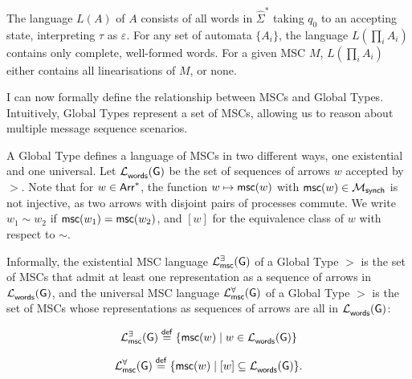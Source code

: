 \begin{definition}
The language $L(A)$ of $A$ consists of all words in $\hat{\Sigma}^*$ 
taking $q_0$ to an accepting state, interpreting $\tau$ as 
$\varepsilon$. For any set of automata $\{A_i\}$, the language 
$L(\prod_i A_i)$ contains only complete, well-formed words. For a 
given MSC $M$, $L(\prod_i A_i)$ either contains all linearisations 
of $M$, or none.
\end{definition}




I can now formally define the relationship between MSCs and Global Types. 
Intuitively, Global Types represent a set of MSCs, allowing us to reason 
about multiple message sequence scenarios. 

A Global Type defines a language of MSCs in two different ways, one
existential and one universal. Let $\mathcal{L}_{\mathsf{words}}^{}(\mathsf{G})$ be the set of
sequences of arrows $w$ accepted by $\gt$. Note that for $w \in \mathsf{Arr}^*$,
the function $w \mapsto \mathsf{msc}(w)$ with
$\mathsf{msc}(w) \in \mathcal{M}_{\mathsf{synch}}$ is not injective, as two
arrows with disjoint pairs of processes commute. We write $w_1 \sim w_2$ if
$\mathsf{msc}(w_1) = \mathsf{msc}(w_2)$, and $[w]$ for the equivalence class
of $w$ with respect to $\sim$.

Informally, the existential MSC language $\mathcal{L}_{\mathsf{msc}}^{\exists}(\mathsf{G}){}$ of a 
Global Type $\gt$ is the set of MSCs that admit at least one representation as a
sequence of arrows in $\mathcal{L}_{\mathsf{words}}^{}(\mathsf{G})$, and the universal MSC
language $\universalmsclanguageof{\gt}$ of a Global Type $\gt$ is the set of
MSCs whose representations as sequences of arrows are all in
$\mathcal{L}_{\mathsf{words}}^{}(\mathsf{G})$:

\bigskip

\begin{definition}[$\existentialmsclanguageof{\gt}$]
	$$
		\mathcal{L}_{\mathsf{msc}}^{\exists}(\mathsf{G}) \stackrel{\mathsf{def}}{=} \{\mathsf{msc}(w) \mid
		w \in \mathcal{L}_{\mathsf{words}}^{}(\mathsf{G})\}
  $$
\end{definition}

\bigskip

\begin{definition}[$\universalmsclanguageof{\gt}$]
  $$
		\mathcal{L}_{\mathsf{msc}}^{\forall}(\mathsf{G}) \stackrel{\mathsf{def}}{=} \{\mathsf{msc}(w) \mid
		[w] \subseteq \mathcal{L}_{\mathsf{words}}^{}(\mathsf{G})\}.
	$$
\end{definition}

